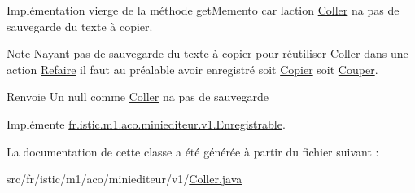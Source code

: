 Implémentation vierge de la méthode get\+Memento car l\textquotesingle{}action \hyperlink{classfr_1_1istic_1_1m1_1_1aco_1_1miniediteur_1_1v1_1_1Coller}{Coller} n\textquotesingle{}a pas de sauvegarde du texte à copier. 

\begin{DoxyNote}{Note}
N\textquotesingle{}ayant pas de sauvegarde du texte à copier pour réutiliser \hyperlink{classfr_1_1istic_1_1m1_1_1aco_1_1miniediteur_1_1v1_1_1Coller}{Coller} dans une action \hyperlink{classfr_1_1istic_1_1m1_1_1aco_1_1miniediteur_1_1v1_1_1Refaire}{Refaire} il faut au préalable avoir enregistré soit \hyperlink{classfr_1_1istic_1_1m1_1_1aco_1_1miniediteur_1_1v1_1_1Copier}{Copier} soit \hyperlink{classfr_1_1istic_1_1m1_1_1aco_1_1miniediteur_1_1v1_1_1Couper}{Couper}. 
\end{DoxyNote}
\begin{DoxyReturn}{Renvoie}
Un null comme \hyperlink{classfr_1_1istic_1_1m1_1_1aco_1_1miniediteur_1_1v1_1_1Coller}{Coller} n\textquotesingle{}a pas de sauvegarde 
\end{DoxyReturn}


Implémente \hyperlink{interfacefr_1_1istic_1_1m1_1_1aco_1_1miniediteur_1_1v1_1_1Enregistrable_aadf173c765d103d3924bbb688c45abb6}{fr.\+istic.\+m1.\+aco.\+miniediteur.\+v1.\+Enregistrable}.



La documentation de cette classe a été générée à partir du fichier suivant \+:\begin{DoxyCompactItemize}
\item 
src/fr/istic/m1/aco/miniediteur/v1/\hyperlink{Coller_8java}{Coller.\+java}\end{DoxyCompactItemize}

